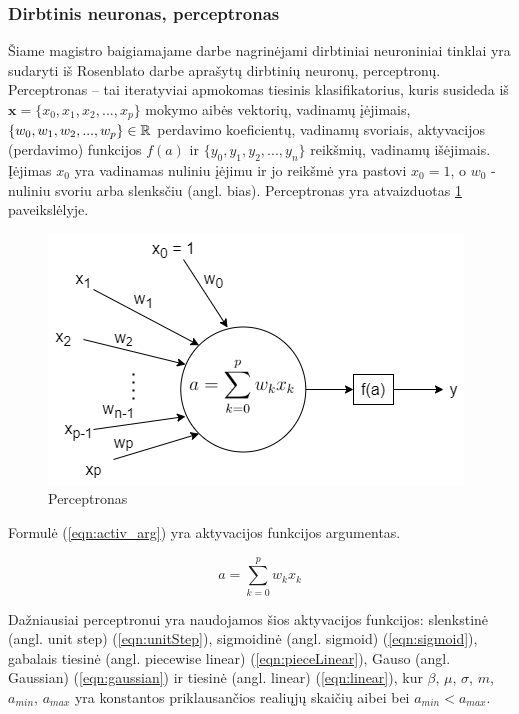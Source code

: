 \subsubsection{Dirbtinis neuronas, perceptronas}

Šiame magistro baigiamajame darbe nagrinėjami dirbtiniai neuroniniai tinklai yra sudaryti iš Rosenblato darbe \cite{rosenPerc} aprašytų dirbtinių neuronų, perceptronų. Perceptronas --  tai iteratyviai apmokomas tiesinis klasifikatorius, kuris susideda iš $\boldsymbol{x} = \{x_{0}, x_{1}, x_{2}, ..., x_{p}\}$ mokymo aibės vektorių, vadinamų įėjimais, $\{w_{0}, w_{1}, w_{2}, ..., w_{p}\} \in \mathbb{R}$ perdavimo koeficientų, vadinamų svoriais, aktyvacijos (perdavimo) funkcijos $f(a)$ ir $\{y_{0}, y_{1}, y_{2}, ..., y_{n}\}$ reikšmių, vadinamų išėjimais. Įėjimas $x_{0}$ yra vadinamas nuliniu įėjimu ir jo reikšmė yra pastovi $x_{0} = 1$, o $w_{0}$ - nuliniu svoriu arba slenksčiu (angl. bias). Perceptronas yra atvaizduotas \ref{img:perceptron} paveikslėlyje.

\begin{figure}[H]
	\centering
	\includegraphics[scale=0.5]{img/perceptron.png}
	\caption{Perceptronas}
	\label{img:perceptron}
\end{figure}

Formulė (\ref{eqn:activ_arg}) yra aktyvacijos funkcijos argumentas.

\begin{equation}
	\label{eqn:activ_arg}
	a = \sum_{k = 0}^{p} w_{k}x_k
\end{equation}

Dažniausiai perceptronui yra naudojamos šios aktyvacijos funkcijos: slenkstinė (angl. unit step) (\ref{eqn:unitStep}), sigmoidinė (angl. sigmoid) (\ref{eqn:sigmoid}), gabalais tiesinė (angl. piecewise linear) (\ref{eqn:pieceLinear}), Gauso (angl. Gaussian) (\ref{eqn:gaussian}) ir tiesinė (angl. linear) (\ref{eqn:linear}), kur $\beta$, $\mu$, $\sigma$, $m$, $a_{min}$, $a_{max}$ yra konstantos priklausančios realiųjų skaičių aibei bei $a_{min} < a_{max}$.

